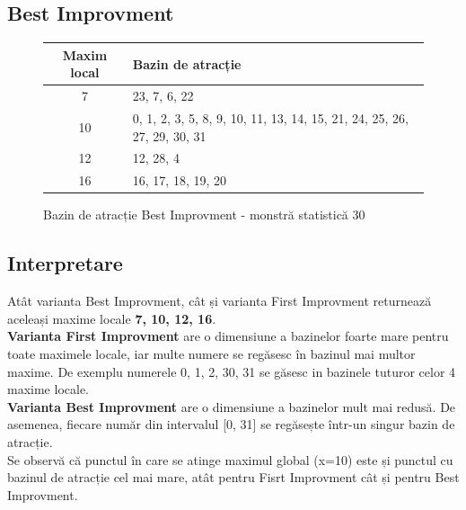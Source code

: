 \documentclass{article}
\begin{document}
\subsection{Best Improvment}

\begin{figure}[!h]
\begin{tabular}{||c|||l||}
  \hline
  Maxim local & Bazin de atracție \\ \hline \hline
  7 & 23, 7, 6, 22 \\ \hline  
  10 & 0, 1, 2, 3, 5, 8, 9, 10, 11, 13, 14, 15, 21, 24, 25, 26, 27, 29, 30, 31 \\ \hline
  12 & 12, 28, 4\\ \hline
  16 & 16, 17, 18, 19, 20 \\ \hline
 
\end{tabular}
\caption{Bazin de atracție Best Improvment - monstră statistică 30}
\end{figure}






\subsection{Interpretare}
Atât varianta Best Improvment, cât și varianta First Improvment returnează aceleași maxime locale \textbf{7, 10, 12, 16}.\\ 
\textbf{Varianta First Improvment} are o dimensiune a bazinelor foarte mare pentru toate maximele locale, iar multe numere se regăsesc în bazinul mai multor maxime. De exemplu numerele 0, 1, 2, 30, 31 se găsesc in bazinele tuturor celor 4 maxime locale.\\
\textbf{Varianta Best Improvment} are o dimensiune a bazinelor mult mai redusă. De asemenea, fiecare număr din intervalul [0, 31] se regăsește într-un singur bazin de atracție.\\
Se observă că punctul în care se atinge maximul global (x=10) este și punctul cu bazinul de atracție cel mai mare, atât pentru Fisrt Improvment cât și pentru Best Improvment.
\end{document}

